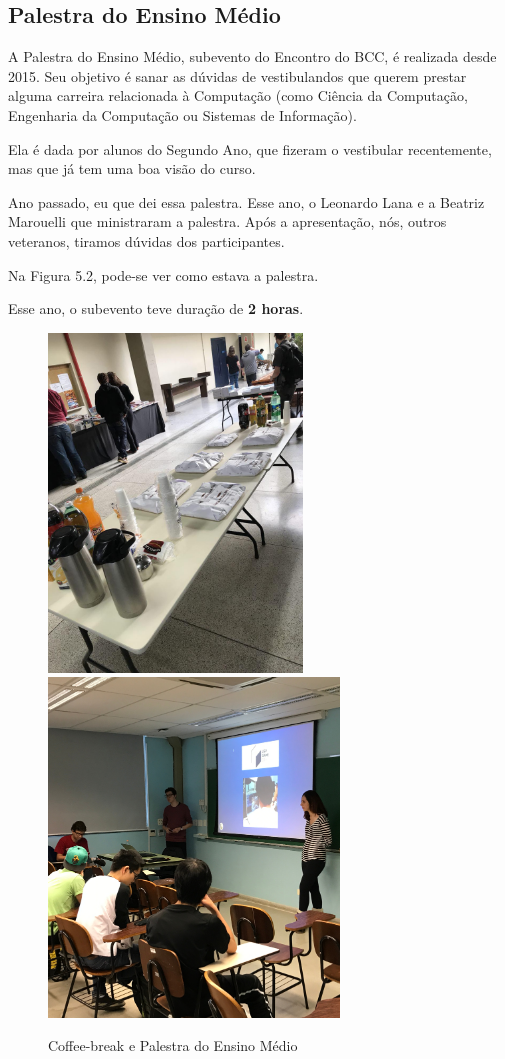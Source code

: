 \documentclass[12pt,letterpaper]{article}
\begin{document}
	\subsection{Palestra do Ensino Médio}
	
	A Palestra do Ensino Médio, subevento do Encontro do BCC, é realizada desde 2015. Seu objetivo é sanar as dúvidas de vestibulandos que querem prestar alguma carreira relacionada à Computação (como Ciência da Computação, Engenharia da Computação ou Sistemas de Informação).
	
	Ela é dada por alunos do Segundo Ano, que fizeram o vestibular recentemente, mas que já tem uma boa visão do curso. 
	
	Ano passado, eu que dei essa palestra. Esse ano, o Leonardo Lana e a Beatriz Marouelli que ministraram a palestra. Após a apresentação, nós, outros veteranos, tiramos dúvidas dos participantes.
	
	Na Figura 5.2, pode-se ver como estava a palestra.
	
	Esse ano, o subevento teve duração de \textbf{2 horas}.
	
	\begin{figure}
		\begin{center}
			\includegraphics[height=9cm]{comida.jpg}  
			\includegraphics[height=9cm]{em2.jpg}
			\caption{Coffee-break e Palestra do Ensino Médio} 
		\end{center}
	\end{figure}
	
\end{document}
